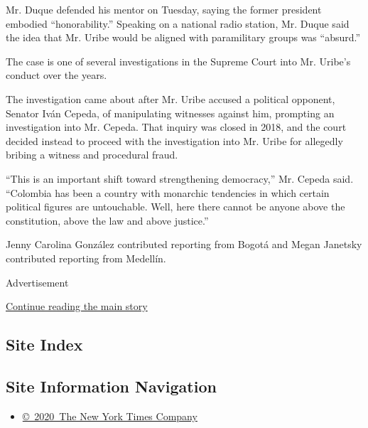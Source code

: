 Mr. Duque defended his mentor on Tuesday, saying the former president
embodied ``honorability.'' Speaking on a national radio station, Mr.
Duque said the idea that Mr. Uribe would be aligned with paramilitary
groups was ``absurd.''

The case is one of several investigations in the Supreme Court into Mr.
Uribe's conduct over the years.

The investigation came about after Mr. Uribe accused a political
opponent, Senator Iván Cepeda, of manipulating witnesses against him,
prompting an investigation into Mr. Cepeda. That inquiry was closed in
2018, and the court decided instead to proceed with the investigation
into Mr. Uribe for allegedly bribing a witness and procedural fraud.

``This is an important shift toward strengthening democracy,'' Mr.
Cepeda said. ``Colombia has been a country with monarchic tendencies in
which certain political figures are untouchable. Well, here there cannot
be anyone above the constitution, above the law and above justice.''

Jenny Carolina González contributed reporting from Bogotá and Megan
Janetsky contributed reporting from Medellín.

Advertisement

\protect\hyperlink{after-bottom}{Continue reading the main story}

\hypertarget{site-index}{%
\subsection{Site Index}\label{site-index}}

\hypertarget{site-information-navigation}{%
\subsection{Site Information
Navigation}\label{site-information-navigation}}

\begin{itemize}
\tightlist
\item
  \href{https://help.nytimes.com/hc/en-us/articles/115014792127-Copyright-notice}{©~2020~The
  New York Times Company}
\end{itemize}

